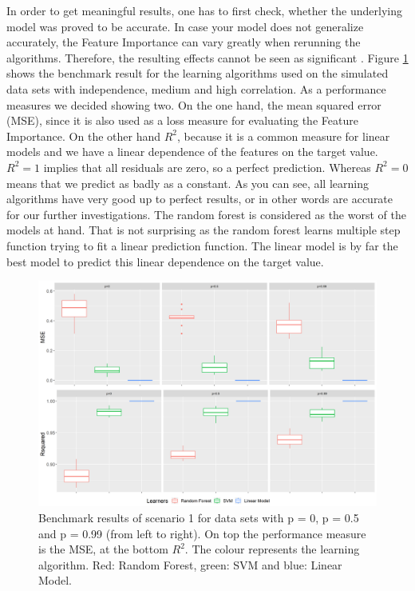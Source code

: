 \documentclass[
]{krantz}
\begin{document}
In order to get meaningful results, one has to first check, whether the underlying model was proved to be accurate. In case your model does not generalize accurately, the Feature Importance can vary greatly when rerunning the algorithms. Therefore, the resulting effects cannot be seen as significant \citep{parr2018}. Figure \ref{fig:bmr01} shows the benchmark result for the learning algorithms used on the simulated data sets with independence, medium and high correlation. As a performance measures we decided showing two. On the one hand, the mean squared error (MSE), since it is also used as a loss measure for evaluating the Feature Importance. On the other hand \(R^2\), because it is a common measure for linear models and we have a linear dependence of the features on the target value. \(R^2 = 1\) implies that all residuals are zero, so a perfect prediction. Whereas \(R^2 = 0\) means that we predict as badly as a constant. As you can see, all learning algorithms have very good up to perfect results, or in other words are accurate for our further investigations. The random forest is considered as the worst of the models at hand. That is not surprising as the random forest learns multiple step function trying to fit a linear prediction function. The linear model is by far the best model to predict this linear dependence on the target value.

\begin{figure}
\includegraphics[width=1\linewidth]{images/bmr01b} \caption{Benchmark results of scenario 1 for data sets with p = 0, p = 0.5 and p = 0.99 (from left to right). On top the performance measure is the MSE, at the bottom $R^2$. The colour represents the learning algorithm. Red: Random Forest, green: SVM and blue: Linear Model.}\label{fig:bmr01}
\end{figure}
\end{document}
